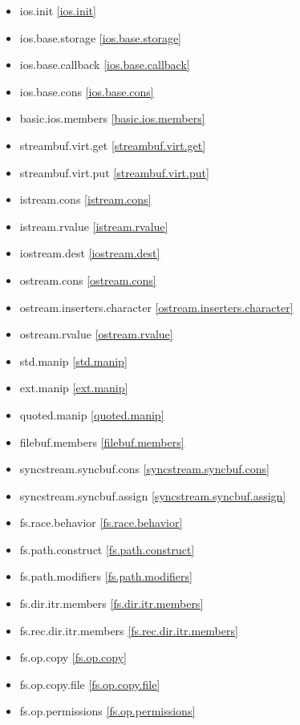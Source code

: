 \begin{multicols}{2}
\begin{itemize}
\item{ios.init}							\ref{ios.init}
\item{ios.base.storage}					\ref{ios.base.storage}
\item{ios.base.callback}				\ref{ios.base.callback}
\item{ios.base.cons}					\ref{ios.base.cons}
\item{basic.ios.members}				\ref{basic.ios.members}
\item{streambuf.virt.get}				\ref{streambuf.virt.get}
\item{streambuf.virt.put}				\ref{streambuf.virt.put}
\item{istream.cons}						\ref{istream.cons}
\item{istream.rvalue}					\ref{istream.rvalue}
\item{iostream.dest}					\ref{iostream.dest}
\item{ostream.cons}						\ref{ostream.cons}
\item{ostream.inserters.character}		\ref{ostream.inserters.character}
\item{ostream.rvalue}					\ref{ostream.rvalue}
\item{std.manip}						\ref{std.manip}
\item{ext.manip}						\ref{ext.manip}
\item{quoted.manip}						\ref{quoted.manip}
\item{filebuf.members}					\ref{filebuf.members}
\item{syncstream.syncbuf.cons}			\ref{syncstream.syncbuf.cons}
\item{syncstream.syncbuf.assign}		\ref{syncstream.syncbuf.assign}
\item{fs.race.behavior}					\ref{fs.race.behavior}
\item{fs.path.construct}				\ref{fs.path.construct}
\item{fs.path.modifiers}				\ref{fs.path.modifiers}
\item{fs.dir.itr.members}				\ref{fs.dir.itr.members}
\item{fs.rec.dir.itr.members}			\ref{fs.rec.dir.itr.members}
\item{fs.op.copy}						\ref{fs.op.copy}
\item{fs.op.copy.file}					\ref{fs.op.copy.file}
\item{fs.op.permissions}				\ref{fs.op.permissions}
\end{itemize}
\end{multicols}

